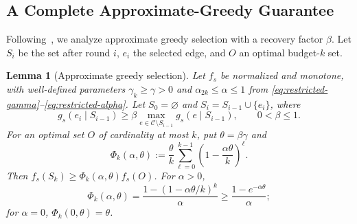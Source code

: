 \documentclass[conference]{IEEEtran}
\newtheorem{lemma}{Lemma}
\theoremstyle{definition}
\begin{document}
\subsection{A Complete Approximate-Greedy Guarantee}

Following~\cite{bian2017}, we analyze approximate
greedy selection with a recovery factor $\beta$.
Let $S_i$ be the set after round $i$, $e_i$ the
selected edge, and $O$ an optimal budget-$k$ set.

\begin{lemma}[Approximate greedy selection]
\label{lem:approximate-greedy}
Let $f_s$ be normalized and monotone, with well-defined parameters
$\gamma_k\ge\gamma>0$ and $\alpha_{2k}\le\alpha\le1$ from
\eqref{eq:restricted-gamma}--\eqref{eq:restricted-alpha}.
Let $S_0=\varnothing$ and $S_i=S_{i-1}\cup\{e_i\}$, where
\begin{equation}
 g_s(e_i\mid S_{i-1})\geq
 \beta\max_{e\in\mathcal C\setminus S_{i-1}}g_s(e\mid S_{i-1}),
 \qquad 0<\beta\leq1.
 \label{eq:beta-greedy-condition}
\end{equation}
For an optimal set $O$ of cardinality at most $k$, put
$\theta=\beta\gamma$ and
\begin{equation}
 \Phi_k(\alpha,\theta)
 :=\frac{\theta}{k}\sum_{\ell=0}^{k-1}
       \left(1-\frac{\alpha\theta}{k}\right)^\ell.
 \label{eq:finite-greedy-bound}
\end{equation}
Then $f_s(S_k)\geq \Phi_k(\alpha,\theta)f_s(O)$.
For $\alpha>0$,
\[
 \Phi_k(\alpha,\theta)
 =\frac{1-(1-\alpha\theta/k)^k}{\alpha}
 \geq\frac{1-e^{-\alpha\theta}}{\alpha};
\]
for $\alpha=0$, $\Phi_k(0,\theta)=\theta$.
\end{lemma}
\end{document}
